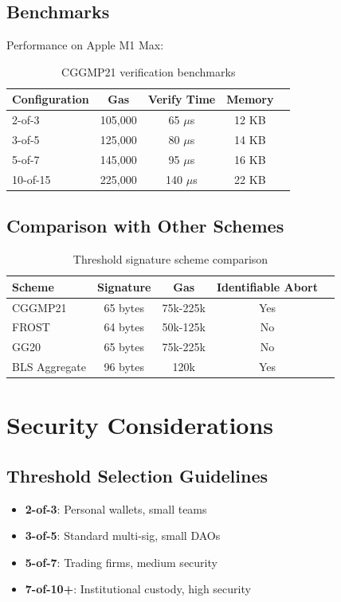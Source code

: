 \documentclass[11pt,a4paper]{article}
\theoremstyle{definition}
\begin{document}
\subsection{Benchmarks}

Performance on Apple M1 Max:

\begin{table}[h]
\centering
\begin{tabular}{lcccc}
\toprule
Configuration & Gas & Verify Time & Memory \\
\midrule
2-of-3 & 105,000 & 65 $\mu$s & 12 KB \\
3-of-5 & 125,000 & 80 $\mu$s & 14 KB \\
5-of-7 & 145,000 & 95 $\mu$s & 16 KB \\
10-of-15 & 225,000 & 140 $\mu$s & 22 KB \\
\bottomrule
\end{tabular}
\caption{CGGMP21 verification benchmarks}
\end{table}

\subsection{Comparison with Other Schemes}

\begin{table}[h]
\centering
\begin{tabular}{lcccc}
\toprule
Scheme & Signature & Gas & Identifiable Abort \\
\midrule
CGGMP21 & 65 bytes & 75k-225k & Yes \\
FROST & 64 bytes & 50k-125k & No \\
GG20 & 65 bytes & 75k-225k & No \\
BLS Aggregate & 96 bytes & 120k & Yes \\
\bottomrule
\end{tabular}
\caption{Threshold signature scheme comparison}
\end{table}

\section{Security Considerations}

\subsection{Threshold Selection Guidelines}

\begin{itemize}
\item \textbf{2-of-3}: Personal wallets, small teams
\item \textbf{3-of-5}: Standard multi-sig, small DAOs
\item \textbf{5-of-7}: Trading firms, medium security
\item \textbf{7-of-10+}: Institutional custody, high security
\end{itemize}
\end{document}

